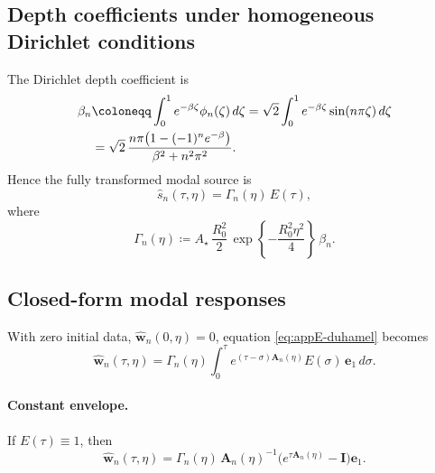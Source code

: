 \subsection{Depth coefficients under homogeneous Dirichlet conditions}
\label{sec:appE-depth-source-coeffs}

The Dirichlet depth coefficient is
\begin{align}
    \beta_n
     & \coloneqq
    \int_0^1 e^{-\beta\zeta}\phi_n(\zeta)\, d\zeta
    =
    \sqrt{2}\int_0^1 e^{-\beta\zeta}\sin(n\pi\zeta)\, d\zeta
    \notag       \\
     & =
    \sqrt{2}\,
    \frac{n\pi\bigl(1-(-1)^n e^{-\beta}\bigr)}
    {\beta^2+n^2\pi^2}.
    \label{eq:appE-depth-exp-decay}
\end{align}
Hence the fully transformed modal source is
\begin{equation}
    \widehat{s}_n(\tau,\eta)
    =
    \Gamma_n(\eta)\, E(\tau),
    \label{eq:appE-transformed-source}
\end{equation}
where
\begin{equation}
    \Gamma_n(\eta)
    \coloneqq
    A_\star\,
    \frac{R_0^2}{2}\,
    \exp\!\left\{-\frac{R_0^2\eta^2}{4}\right\}\,
    \beta_n.
    \label{eq:appE-gamma-n}
\end{equation}

\subsection{Closed-form modal responses}
\label{sec:appE-closed-form-modal-responses}

With zero initial data,
\(
\widehat{\mathbf{w}}_n(0,\eta)=0
\),
equation \eqref{eq:appE-duhamel} becomes
\begin{equation}
    \widehat{\mathbf{w}}_n(\tau,\eta)
    =
    \Gamma_n(\eta)
    \int_0^\tau
    e^{(\tau-\sigma)\mathbf{A}_n(\eta)}
    E(\sigma)\,\mathbf{e}_1\, d\sigma.
    \label{eq:appE-modal-source-only}
\end{equation}

\paragraph{Constant envelope.}
If \(E(\tau)\equiv 1\), then
\begin{equation}
    \widehat{\mathbf{w}}_n(\tau,\eta)
    =
    \Gamma_n(\eta)\,
    \mathbf{A}_n(\eta)^{-1}
    \bigl(
    e^{\tau \mathbf{A}_n(\eta)}-\mathbf{I}
    \bigr)\mathbf{e}_1.
    \label{eq:appE-constant-envelope}
\end{equation}


